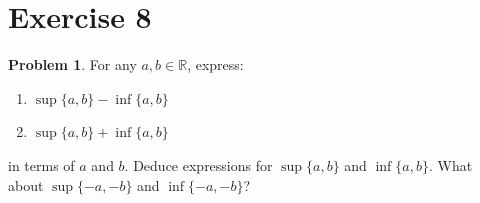 \documentclass{article}
\theoremstyle{definition}
\newtheorem{problem}{Problem}
\begin{document}
\section*{Exercise 8}

\begin{problem}
For any \( a, b \in \mathbb{R} \), express:
\begin{enumerate}[label=(\roman*)]
    \item \( \sup\{a, b\} - \inf\{a, b\} \)
    \item \( \sup\{a, b\} + \inf\{a, b\} \)
\end{enumerate}
in terms of \( a \) and \( b \). Deduce expressions for \( \sup\{a, b\} \) and \( \inf\{a, b\} \). What about \( \sup\{-a, -b\} \) and \( \inf\{-a, -b\} \)?
\end{problem}
\end{document}
